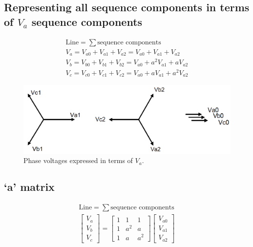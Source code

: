 \subsection{Representing all sequence components in terms of $V_{a}$ sequence components}
\begin{gather}
	\textrm{Line} = \sum \textrm{sequence components}\\
	V_a = V_{a0} + V_{a1} + V_{a2} = V_{a0} + V_{a1} + V_{a2}\\
	V_b = V_{b0} + V_{b1} + V_{b2} = V_{a0} + a^2 V_{a1} + aV_{a2}\\
	V_c = V_{c0} + V_{c1} + V_{c2} = V_{a0} + aV_{a1} + a^2V_{a2}
\end{gather}
\begin{figure}[H]
	\centering
	\includegraphics[width = \textwidth]{./img/figure30.png}
	\caption{Phase voltages expressed in terms of $V_{a}$.}
\end{figure}
\subsection{`a' matrix}
\begin{gather}
	\textrm{Line} = \sum \textrm{sequence components}\\
	\begin{bmatrix}
		V_a \\
		V_b \\
		V_c
	\end{bmatrix} = \begin{bmatrix}
		1 & 1   & 1   \\
		1 & a^2 & a   \\
		1 & a   & a^2
	\end{bmatrix}\begin{bmatrix}
		V_{a0} \\
		V_{a1} \\
		V_{a2}
	\end{bmatrix}
\end{gather}
